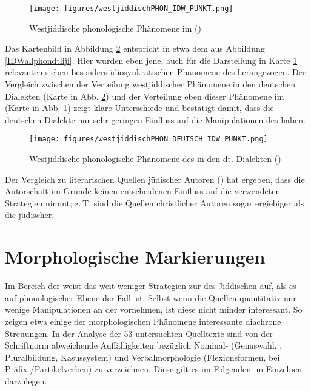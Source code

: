  
  \begin{figure}[h!]
		\centering
\texttt{[image: figures/westjiddischPHON\_IDW\_PUNKT.png]}
		\caption{\label{westjiddischphonIDW} Westjiddische phonologische Phänomene im  ()}
		\end{figure}
\FloatBarrier
		 
 Das Kartenbild in Abbildung \ref{allphonnegIDWdeutsch} entspricht in etwa dem aus Abbildung \ref{IDWallphondtliji}. Hier wurden eben jene, auch für die Darstellung in Karte \ref{westjiddischphonIDW} relevanten sieben besonders idiosynkratischen Phänomene des  herangezogen. Der Vergleich zwischen der Verteilung westjiddischer Phänomene in den deutschen Dialekten (Karte in Abb. \ref{allphonnegIDWdeutsch}) und der Verteilung eben dieser Phänomene im  (Karte in Abb. \ref{westjiddischphonIDW}) zeigt klare Unterschiede und bestätigt damit, dass die deutschen Dialekte nur sehr geringen Einfluss auf die Manipulationen des  haben.\\
 
  \begin{figure}[h!]
		\centering
\texttt{[image: figures/westjiddischPHON\_DEUTSCH\_IDW\_PUNKT.png]}
		\caption{\label{allphonnegIDWdeutsch} Westjiddische phonologische Phänomene des  in den dt. Dialekten ()}
		\end{figure}
\FloatBarrier
  
 Der Vergleich zu literarischen Quellen jüdischer Autoren () hat ergeben, dass die Autorschaft im Grunde keinen entscheidenen Einfluss auf die verwendeten Strategien nimmt; z.\,T. sind die Quellen christlicher Autoren sogar ergiebiger als die jüdischer. \\	
 
 
  \chapter{Morphologische Markierungen}\label{morphologie}
Im Bereich der  weist das  weit weniger Strategien zur  des Jiddischen auf, als es auf phonologischer Ebene der Fall ist. Selbst wenn die Quellen quantitativ nur wenige Manipulationen an der  vornehmen, ist diese nicht minder interessant. So zeigen etwa einige der morphologischen Phänomene interessante diachrone Streuungen. In der Analyse der 53 untersuchten Quelltexte sind von der Schriftnorm abweichende Auffälligkeiten bezüglich Nominal- (Genuswahl, , Pluralbildung, Kasussystem) und Verbalmorphologie (Flexionsformen,  bei Präfix-/Partikelverben) zu verzeichnen. Diese gilt es im Folgenden im Einzelnen darzulegen. \\


